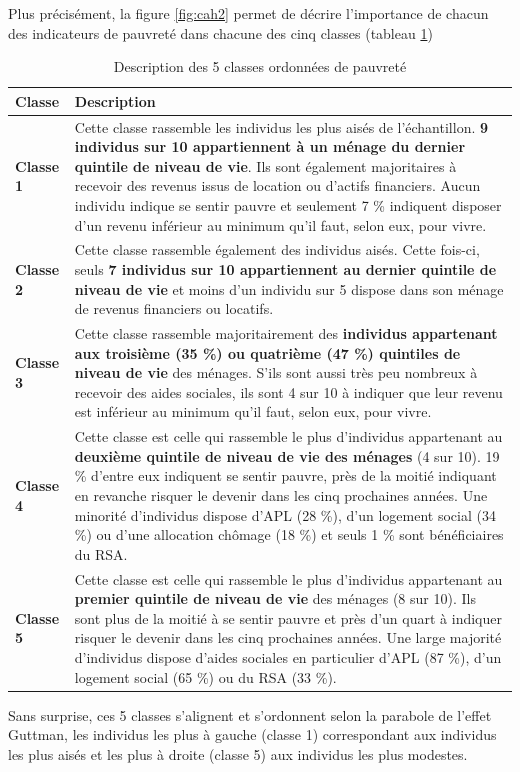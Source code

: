 \documentclass[12pt,a4paper]{reedthesis}
\begin{document}
Plus précisément, la figure \ref{fig:cah2} permet de décrire l'importance de chacun des indicateurs de pauvreté dans chacune des cinq classes (tableau \ref{tab:tabclasses1})
\begin{longtable}[t]{>{}l>{\raggedright\arraybackslash}p{11cm}}
\caption{\label{tab:tabclasses1}Description des 5 classes ordonnées de pauvreté}\\
\toprule
Classe & Description\\
\midrule
\textbf{Classe 1} & Cette classe rassemble les individus les plus aisés de l’échantillon. \textbf{9 individus sur 10 appartiennent à un ménage du dernier quintile de niveau de vie}. Ils sont également majoritaires à recevoir des revenus issus de location ou d’actifs financiers. Aucun individu indique se sentir pauvre et seulement 7 \% indiquent disposer d’un revenu inférieur au minimum qu’il faut, selon eux, pour vivre.\\
\textbf{Classe 2} & Cette classe rassemble également des individus aisés. Cette fois-ci, seuls \textbf{7 individus sur 10 appartiennent au dernier quintile de niveau de vie} et moins d’un individu sur 5 dispose dans son ménage de revenus financiers ou locatifs.\\
\textbf{Classe 3} & Cette classe rassemble majoritairement des \textbf{individus appartenant aux troisième (35 \%) ou quatrième (47 \%) quintiles de niveau de vie} des ménages. S’ils sont aussi très peu nombreux à recevoir des aides sociales, ils sont 4 sur 10 à indiquer que leur revenu est inférieur au minimum qu’il faut, selon eux, pour vivre.\\
\textbf{Classe 4} & Cette classe est celle qui rassemble le plus d’individus appartenant au \textbf{deuxième quintile de niveau de vie des ménages} (4 sur 10). 19 \% d’entre eux indiquent se sentir pauvre, près de la moitié indiquant en revanche risquer le devenir dans les cinq prochaines années. Une minorité d’individus dispose d’APL (28 \%), d’un logement social (34 \%) ou d’une allocation chômage (18 \%) et seuls 1 \% sont bénéficiaires du RSA.\\
\textbf{Classe 5} & Cette classe est celle qui rassemble le plus d’individus appartenant au \textbf{premier quintile de niveau de vie} des ménages (8 sur 10). Ils sont plus de la moitié à se sentir pauvre et près d’un quart à indiquer risquer le devenir dans les cinq prochaines années. Une large majorité d’individus dispose d’aides sociales en particulier d’APL (87 \%), d’un logement social (65 \%) ou du RSA (33 \%).\\
\bottomrule
\end{longtable}
Sans surprise, ces 5 classes s'alignent et s'ordonnent selon la parabole de l'effet Guttman, les individus les plus à gauche (classe 1) correspondant aux individus les plus aisés et les plus à droite (classe 5) aux individus les plus modestes.
\end{document}
